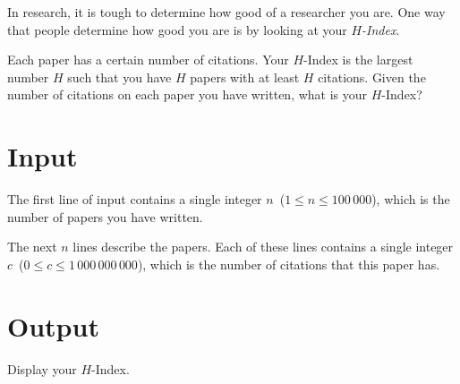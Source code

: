 


In research, it is tough to determine how good of a researcher you are. One way that people determine how good you are is by looking at your \textit{$H$-Index}.

Each paper has a certain number of citations. Your $H$-Index is the largest number $H$ such that you have $H$ papers with at least $H$ citations. Given the number of citations on each paper you have written, what is your $H$-Index?

\section*{Input}

The first line of input contains a single integer $n$~($1 \leq n \leq 100\,000$), which is the number of papers you have written.

The next $n$ lines describe the papers. Each of these lines contains a single integer $c$~($0 \leq c \leq 1\,000\,000\,000$), which is the number of citations that this paper has.

\section*{Output}

Display your $H$-Index.
